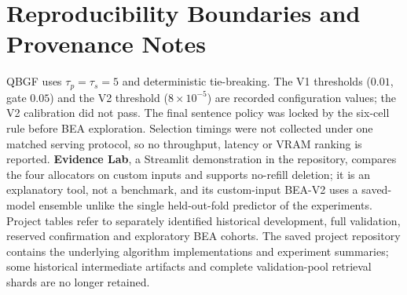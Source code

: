 \documentclass[10pt,twocolumn,letterpaper]{article}
\begin{document}
\section{Reproducibility Boundaries and Provenance Notes}\label{app:repro}
QBGF uses $\tau_p{=}\tau_s{=}5$ and deterministic tie-breaking. The V1 thresholds ($0.01$, gate $0.05$) and the V2 threshold ($8{\times}10^{-5}$) are recorded configuration values; the V2 calibration did not pass. The final sentence policy was locked by the six-cell rule before BEA exploration. Selection timings were not collected under one matched serving protocol, so no throughput, latency or VRAM ranking is reported. \textbf{Evidence Lab}, a Streamlit demonstration in the repository, compares the four allocators on custom inputs and supports no-refill deletion; it is an explanatory tool, not a benchmark, and its custom-input BEA-V2 uses a saved-model ensemble unlike the single held-out-fold predictor of the experiments. Project tables refer to separately identified historical development, full validation, reserved confirmation and exploratory BEA cohorts. The saved project repository contains the underlying algorithm implementations and experiment summaries; some historical intermediate artifacts and complete validation-pool retrieval shards are no longer retained.
\end{document}
